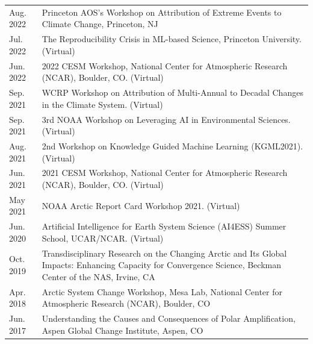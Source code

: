 \documentclass[margin,line,palatino,courier,10pt]{res}
\begin{document}
\begin{resume}
\begin{tabular}{@{}p{0.9in}p{4in}}
Aug. 2022 & Princeton AOS's Workshop on Attribution of Extreme Events to Climate Change, Princeton, NJ\\
Jul. 2022 & The Reproducibility Crisis in ML-based Science, Princeton University. (Virtual)\\
Jun. 2022 & 2022 CESM Workshop, National Center for Atmospheric Research (NCAR), Boulder, CO. (Virtual)\\
Sep. 2021 & WCRP Workshop on Attribution of Multi-Annual to Decadal Changes in the Climate System. (Virtual)\\
Sep. 2021 & 3rd NOAA Workshop on Leveraging AI in Environmental Sciences. (Virtual)\\
Aug. 2021 & 2nd Workshop on Knowledge Guided Machine Learning (KGML2021). (Virtual)\\
Jun. 2021 & 2021 CESM Workshop, National Center for Atmospheric Research (NCAR), Boulder, CO. (Virtual)\\
May 2021 & NOAA Arctic Report Card Workshop 2021. (Virtual)\\
Jun. 2020 & Artificial Intelligence for Earth System Science (AI4ESS) Summer School, UCAR/NCAR. (Virtual)\\
Oct. 2019 & Transdisciplinary Research on the Changing Arctic and Its Global Impacts:  Enhancing Capacity for Convergence Science, Beckman Center of the NAS, Irvine, CA\\
Apr. 2018 & Arctic System Change Workshop, Mesa Lab, National Center for Atmospheric Research (NCAR), Boulder, CO\\
Jun. 2017 & Understanding the Causes and Consequences of Polar Amplification, Aspen Global Change Institute, Aspen, CO
\end{tabular}

\vspace{-0.1in}
\noindent\textcolor{MidnightBlue}{\makebox[\linewidth][r]{\rule{\textwidth}{5pt}}}
\vspace{-0.3in}

\end{resume}
\end{document}
